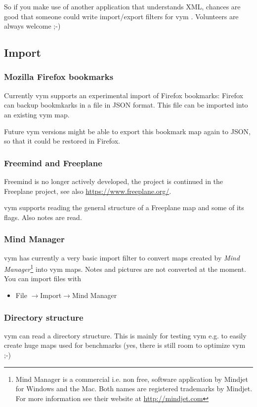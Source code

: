 \documentclass[12pt,a4paper]{article}
\newcommand{\vym}{{\sc vym }}
\newcommand{\ra}{$\longrightarrow$}
\begin{document}
So if you make use of another application that understands XML, chances
are good that someone could write import/export filters for \vym.
Volunteers are always welcome ;-)

\subsection{Import} \label{import}

\subsubsection{Mozilla Firefox bookmarks}
Currently \vym supports an experimental import of Firefox bookmarks:
Firefox can backup bookmkarks in a file in JSON format. This file can be
imported into an existing \vym map.

Future \vym versions might be able to export this bookmark map again to JSON, so
that it could be restored in Firefox.

\subsubsection{Freemind and Freeplane}
Freemind is no longer actively developed, the project is continued in
the Freeplane project, see also
\href{https://www.freeplane.org/}{https://www.freeplane.org/}.

\vym supports reading the general structure of a Freeplane map and some
of its flags. Also notes are read.

\subsubsection{Mind Manager}
\vym has currently a very basic import filter to convert maps created by
{\em Mind Manager}\footnote{Mind Manager is a commercial i.e. non free,
software application by Mindjet for Windows and the Mac. Both names are
registered trademarks by Mindjet. For more information see their website
at \href{http://mindjet.com}{http://mindjet.com}} into \vym maps. Notes
and pictures are not converted at the moment. You can import files with
\begin{itemize}
    \item File \ra Import\ra Mind Manager
\end{itemize}


\subsubsection{Directory structure}
\vym can read a directory structure. This is mainly for
testing \vym e.g. to easily create huge maps used for benchmarks (yes,
there is still room to optimize \vym ;-)
\end{document}
